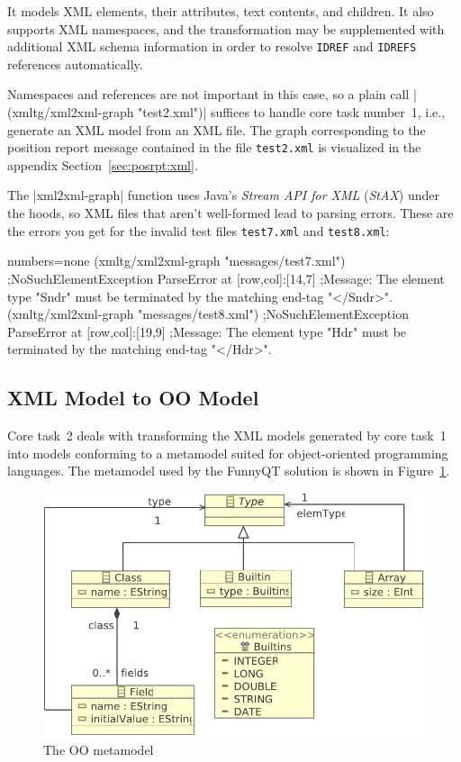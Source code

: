 \documentclass[submission]{eptcs}
\newcommand{\code}{\clojureinline}
\begin{document}
It models XML elements, their attributes, text contents, and children.  It also
supports XML namespaces, and the transformation may be supplemented with
additional XML schema information in order to resolve \texttt{IDREF} and
\texttt{IDREFS} references automatically.

\begin{sloppypar}
  Namespaces and references are not important in this case, so a plain call
  \code|(xmltg/xml2xml-graph "test2.xml")| suffices to handle core task
  number~1, i.e., generate an XML model from an XML file.  The graph
  corresponding to the position report message contained in the file
  \texttt{test2.xml} is visualized in the appendix
  Section~\ref{sec:posrpt:xml}.
\end{sloppypar}

The \code|xml2xml-graph| function uses Java's \emph{Stream API for XML}
(\emph{StAX}) under the hoods, so XML files that aren't well-formed lead to
parsing errors.  These are the errors you get for the invalid test files
\texttt{test7.xml} and \texttt{test8.xml}:

\begin{clojurecode*}{numbers=none}
(xmltg/xml2xml-graph "messages/test7.xml")
;NoSuchElementException ParseError at [row,col]:[14,7]
;Message: The element type "Sndr" must be terminated by the matching end-tag "</Sndr>".
(xmltg/xml2xml-graph "messages/test8.xml")
;NoSuchElementException ParseError at [row,col]:[19,9]
;Message: The element type "Hdr" must be terminated by the matching end-tag "</Hdr>".
\end{clojurecode*}


\subsection{XML Model to OO Model}
\label{sec:xml-to-oo}

Core task~2 deals with transforming the XML models generated by core task~1
into models conforming to a metamodel suited for object-oriented programming
languages.  The metamodel used by the FunnyQT solution is shown in
Figure~\ref{fig:oo-mm}.

\begin{figure}[h!t]
  \centering
  \includegraphics[width=.6\textwidth]{../model/oo}
  \caption{The OO metamodel}
  \label{fig:oo-mm}
\end{figure}
\end{document}
